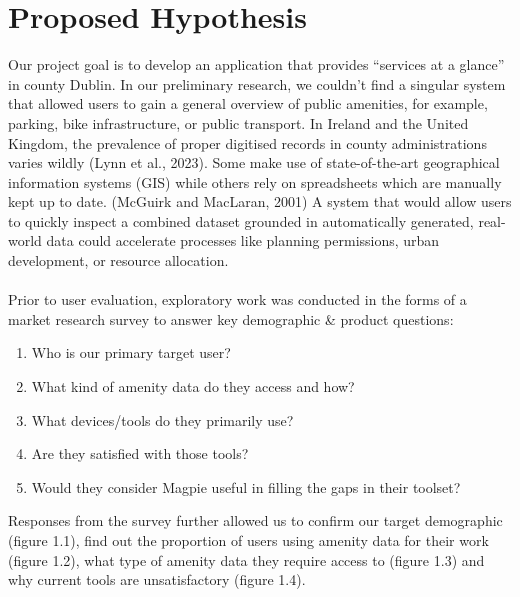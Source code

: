 \documentclass{report}
\begin{document}
\section{Proposed Hypothesis}
Our project goal is to develop an application that provides “services at a glance” in county Dublin. In our preliminary research, we couldn’t find a singular system that allowed users to gain a general overview of public amenities, for example, parking, bike infrastructure, or public transport. In Ireland and the United Kingdom, the prevalence of proper digitised records in county administrations varies wildly (Lynn et al., 2023). Some make use of state-of-the-art geographical information systems (GIS) while others rely on spreadsheets which are manually kept up to date. (McGuirk and MacLaran, 2001) A system that would allow users to quickly inspect a combined dataset grounded in automatically generated, real-world data could accelerate processes like planning permissions, urban development, or resource allocation.\\ \\
Prior to user evaluation, exploratory work was conducted in the forms of a market research survey to answer key demographic \& product questions:
\begin{enumerate}
    \item Who is our primary target user?
    \item What kind of amenity data do they access and how?
    \item What devices/tools do they primarily use?
    \item Are they satisfied with those tools?
    \item Would they consider Magpie useful in filling the gaps in their toolset?
\end{enumerate}
Responses from the survey further allowed us to confirm our target demographic (figure 1.1), find out the proportion of users using amenity data for their work (figure 1.2), what type of amenity data  they require access to (figure 1.3) and why current tools are unsatisfactory (figure 1.4).
\end{document}
